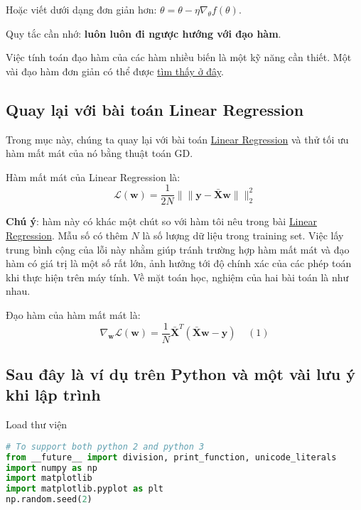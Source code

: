 Hoặc viết dưới dạng đơn giản hơn: $\theta = \theta - \eta \nabla_{\theta} f(\theta)$. 
 
Quy tắc cần nhớ: \textbf{luôn luôn đi ngược hướng với đạo hàm}. 
 
Việc tính toán đạo hàm của các hàm nhiều biến là một kỹ năng cần thiết. Một vài đạo hàm đơn giản có thể được \href{http://machinelearningcoban.com/math/#bang-cac-dao-ham-co-ban}{tìm thấy ở đây}. 
 
\subsection{Quay lại với bài toán Linear Regression}
Trong mục này, chúng ta quay lại với bài toán \href{http://machinelearningcoban.com/2016/12/28/linearregression/}{Linear Regression} và thử tối ưu hàm mất mát của nó bằng thuật toán GD.  
 
Hàm mất mát của Linear Regression là:  
\begin{equation*} 
\mathcal{L}(\mathbf{w}) = \frac{1}{2N}\|\|\mathbf{y - \bar{X}w}\|\|_2^2 
\end{equation*} 
 
\textbf{Chú ý}: hàm này có khác một chút so với hàm tôi nêu trong bài \href{http://machinelearningcoban.com/2016/12/28/linearregression/}{Linear Regression}. Mẫu số có thêm $N$ là số lượng dữ liệu trong training set. Việc lấy trung bình cộng của lỗi này nhằm giúp tránh trường hợp hàm mất mát và đạo hàm có giá trị là một số rất lớn, ảnh hưởng tới độ chính xác của các phép toán khi thực hiện trên máy tính. Về mặt toán học, nghiệm của hai bài toán là như nhau. 
 
Đạo hàm của hàm mất mát là: 
\begin{equation*} 
\nabla_{\mathbf{w}}\mathcal{L}(\mathbf{w}) =  
\frac{1}{N}\mathbf{\bar{X}}^T \mathbf{(\bar{X}w - y)} ~~~~~(1) 
\end{equation*} 
 
 
\subsection{Sau đây là ví dụ trên Python và một vài lưu ý khi lập trình}
 
Load thư viện 
 
 
\begin{lstlisting}[language=Python]
# To support both python 2 and python 3 
from __future__ import division, print_function, unicode_literals 
import numpy as np  
import matplotlib 
import matplotlib.pyplot as plt 
np.random.seed(2) 
\end{lstlisting}
 
